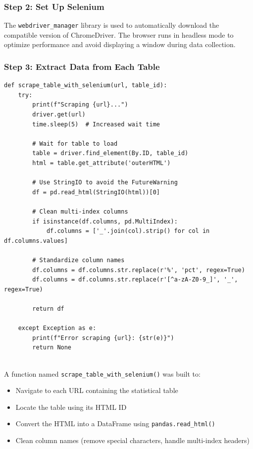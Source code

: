 \documentclass[12pt,a4paper]{article}
\begin{document}
\subsubsection{Step 2: Set Up Selenium}
The \texttt{webdriver\_manager} library is used to automatically download the compatible version of ChromeDriver.  
The browser runs in headless mode to optimize performance and avoid displaying a window during data collection.

\subsubsection{Step 3: Extract Data from Each Table}
\begin{verbatim}
def scrape_table_with_selenium(url, table_id):
    try:
        print(f"Scraping {url}...")
        driver.get(url)
        time.sleep(5)  # Increased wait time

        # Wait for table to load
        table = driver.find_element(By.ID, table_id)
        html = table.get_attribute('outerHTML')

        # Use StringIO to avoid the FutureWarning
        df = pd.read_html(StringIO(html))[0]

        # Clean multi-index columns
        if isinstance(df.columns, pd.MultiIndex):
            df.columns = ['_'.join(col).strip() for col in df.columns.values]

        # Standardize column names
        df.columns = df.columns.str.replace(r'%', 'pct', regex=True)
        df.columns = df.columns.str.replace(r'[^a-zA-Z0-9_]', '_', regex=True)

        return df

    except Exception as e:
        print(f"Error scraping {url}: {str(e)}")
        return None
    
\end{verbatim}

A function named \texttt{scrape\_table\_with\_selenium()} was built to:
\begin{itemize}
\item Navigate to each URL containing the statistical table
\item Locate the table using its HTML ID
\item Convert the HTML into a DataFrame using \texttt{pandas.read\_html()}
\item Clean column names (remove special characters, handle multi-index headers)
\end{itemize}
\end{document}
